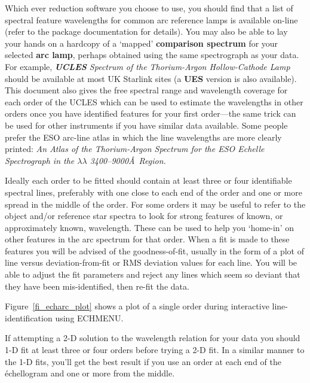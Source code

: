 \documentclass[twoside,11pt]{article}
\newcommand{\htmlref}[2]{#1}
\newcommand{\xref}[3]{#1}
\newcommand{\sgspec}[2]{#1}
\newcommand{\sgspec}[2]{#2}
\begin{document}
Which ever reduction software you choose to use, you should find that a
list of spectral feature wavelengths for common arc reference lamps is
available on-line (refer to the package documentation for details).
You may also be able to lay your hands on a hardcopy of a `mapped'
\htmlref{{\bf comparison spectrum}}{gl_comparison} for your selected
\htmlref{{\bf arc lamp}}{gl_arc},  perhaps obtained using
the same spectrograph as your data.  For example, {\sl
\htmlref{{\bf UCLES}}{gl_ucles} Spectrum
of the Thorium-Argon Hollow-Cathode Lamp} should be available at most UK
Starlink sites (a \htmlref{{\bf UES}}{gl_ues} version is also available).
This document also gives the free spectral range and wavelength coverage
for each order of the UCLES which can be used to estimate the wavelengths
in other orders once you have identified features for your first
order\sgspec{---}{ - }the same trick can be used
for other instruments if you have similar data available.
Some people prefer the ESO arc-line atlas in which the line wavelengths
are more clearly printed:
{\sl An Atlas of the Thorium-Argon Spectrum for the ESO Echelle
Spectrograph in the $\lambda\lambda$ 3400\sgspec{--}{-}9000\AA\ Region.}

Ideally each order to be fitted should contain at least three or four
identifiable
spectral lines, preferably with one close to each end of the order and one
or more spread in the middle of the order.  For some
orders it may be useful to refer to the object and/or reference star
spectra to look for strong features of known, or approximately known,
wavelength.  These can be used to help you `home-in' on other features
in the arc spectrum for that order.
When a fit is made to these features you will be advised of the
goodness-of-fit, usually in the form of a plot of line versus
deviation-from-fit or RMS deviation values for each line.
You will be able to adjust the fit parameters and reject any lines which
seem so deviant that they have been mis-identified, then re-fit the data.

\sgspec{Figure~\ref{fi_echarc_plot}}{The figure above}
shows a plot of a single order
during interactive line-identification using \xref{ECHMENU}{sun152}{}.

If attempting a 2-D solution to the wavelength relation for your data
you should 1-D fit at least three or four orders before trying a 2-D fit.
In a similar manner to the 1-D fits, you'll get the best result if you use
an order at each end of the \'{e}chellogram and one or more from the
middle.
\end{document}
